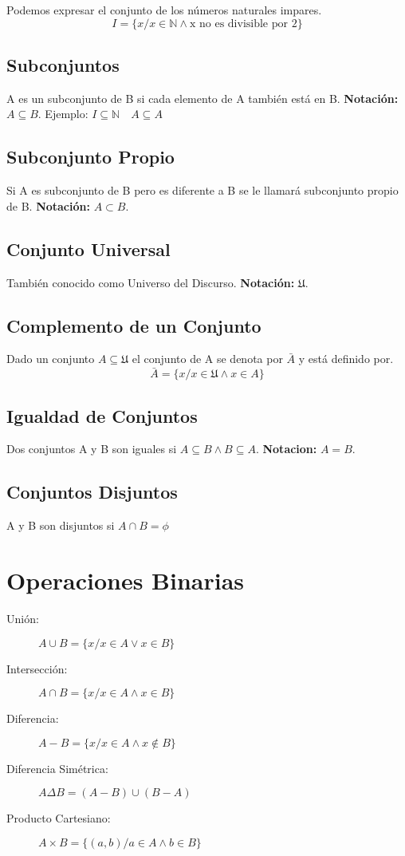 Podemos expresar el conjunto de los números naturales impares.
$$I=\lbrace x/x \in \mathds{N} \land \mbox{x no es divisible por 2}\rbrace$$

\subsection{Subconjuntos}
A es un subconjunto de B si cada elemento de A también está en B. \textbf{Notación: }$A\subseteq B$.
Ejemplo: $I\subseteq \mathds{N} \quad A\subseteq A$

\subsection{Subconjunto Propio}
Si A es subconjunto de B pero es diferente a B se le llamará subconjunto propio de B. \textbf{Notación: }$A \subset B$.

\subsection{Conjunto Universal}
También conocido como Universo del Discurso. \textbf{Notación: }$\mathfrak{U}$.
\subsection{Complemento de un Conjunto}
Dado un conjunto $A\subseteq \mathfrak{U}$ el conjunto de A se denota por $\bar{A}$ y está definido por.
$$\bar{A}=\lbrace x/x \in \mathfrak{U} \land x\in A\rbrace$$

\subsection{Igualdad de Conjuntos}
Dos conjuntos A y B son iguales si $A\subseteq B \land B\subseteq A$. \textbf{Notacion: }$A=B$.
\subsection{Conjuntos Disjuntos}
A y B son disjuntos si $A \cap B=\phi$

\section{Operaciones Binarias}
\begin{description}
\item [Unión: ]$A \cup B=\lbrace x/x \in A \lor x\in B\rbrace$
\item [Intersección: ]$A\cap B=\lbrace x/x \in A \land x\in B\rbrace$
\item [Diferencia: ]$A-B=\lbrace x/x \in A \land x\not\in B\rbrace$
\item [Diferencia Simétrica: ]$A\Delta B=(A-B)\cup(B-A)$
\item [Producto Cartesiano: ]$A\times B=\lbrace(a,b)/a\in A \land b\in B\rbrace$
\end{description}


